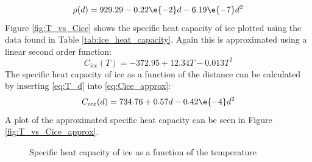 \begin{equation}\label{eq:rho_approx_d}
	\rho(d) = 929.29 - 0.22 \e{-2} d - 6.19 \e{-7} d^2
\end{equation}
Figure \ref{fig:T_vs_Cice} shows the specific heat capacity of ice plotted using the data found in Table \ref{tab:ice_heat_capacity}. Again this is approximated using a linear second order function:
\begin{equation}\label{eq:Cice_approx}
	C_{ice}(T) = -372.95 + 12.34 T - 0.013 T^2
\end{equation}
The specific heat capacity of ice as a function of the distance can be calculated by inserting \eqref{eq:T_d} into \eqref{eq:Cice_approx}:
\begin{equation}\label{eq:Cice_approx_d}
	C_{ice}(d) = 734.76 + 0.57 d - 0.42 \e{-4} d^2
\end{equation}
A plot of the approximated specific heat capacity can be seen in Figure \ref{fig:T_vs_Cice_approx}.
\begin{figure}[htb]
	\centering
	\caption{Specific heat capacity of ice as a function of the temperature}
\end{figure}
